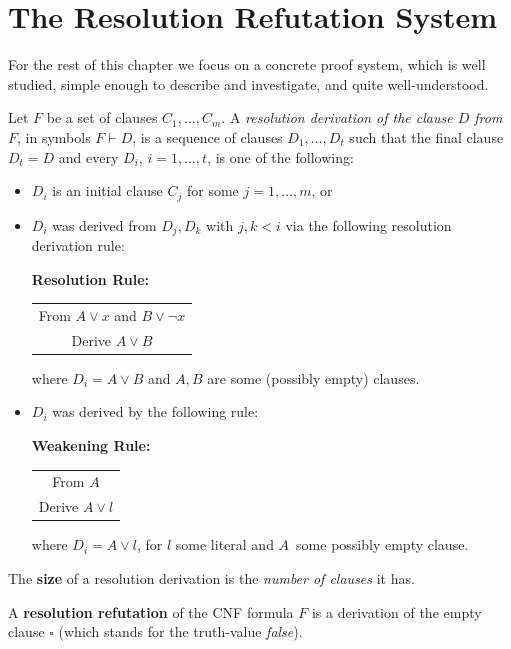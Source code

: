 \section{The Resolution Refutation  System} 

For the rest of this chapter we focus on a  concrete proof system, which is well studied, simple enough to describe and investigate, and quite well-understood. 


\begin{tcolorbox}[colframe=white, colback=red!5, boxrule=0mm, sharp corners]
\begin{definition}
Let $F$ be a set of  clauses $C_1, \dots, C_m$. A \textit{resolution derivation of the clause $D$ from $F$}, in symbols $F\vdash D$,  is a sequence of clauses $D_1, \dots, D_t$ such that the final clause $D_t = D$ 
and every $D_i$, $i=1,\dots,t$, is one of the following:
\begin{itemize}
\item 
$D_i$ is an initial clause $C_j$ for some $j=1,\dots,m$, or
\item $D_i$ was derived from $D_j, D_k$ with $j,k < i$ via the following resolution derivation rule:
 
\textbf{Resolution Rule:}
\begin{center}
    \begin{tabular}{c}
        \hline
        From $A \lor x$ and $B \lor \neg x$ \\
        Derive $A \lor B$ \\
        \hline
    \end{tabular}
\end{center}
where $D_i=A\lor B$ and $A, B$ are some (possibly empty) clauses.
\item 
$D_i$ was derived by the following rule: 

\textbf{Weakening Rule:}
\begin{center}
    \begin{tabular}{c}
        \hline
        From $A$   \\
        Derive $A \lor l$   \\
        \hline
    \end{tabular}
\end{center}
where $D_i=A\lor l$, for $l$ some literal and $A$\ some possibly empty clause. 
\end{itemize}

The \textbf{size} of a resolution derivation is the \emph{number of clauses} it has.

A \textbf{resolution refutation} of the CNF formula $F$ is a derivation of the  empty clause $\square$ (which stands for the truth-value \emph{false}).
\end{definition}
\end{tcolorbox}
